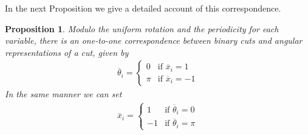 \documentclass[12pt,a4paper]{article}
\theoremstyle{mythm}
\newtheorem{prop}[thm]{Proposition}
\begin{document}
In the next Proposition we give a detailed account of this correspondence.
\begin{prop}
Modulo the uniform rotation and the periodicity for each variable, there is an one-to-one correspondence between binary cuts and angular representations
of a cut, given by
\begin{align}
\label{eq:ass1to1} 
\overline{ \theta } _{ i } = \begin{cases}
0 & \text{if } \overline{ x } _{ i } = 1 \\
\pi & \text{if } \overline{ x } _{ i } = -1
\end{cases}
\end{align} 
In the same manner we can set
\begin{align*}
\overline{ x } _{ i } = \begin{cases}
1 & \text{if } \overline{ \theta } _{ i } = 0 \\
-1 & \text{if } \overline{ \theta } _{ i  } = \pi
\end{cases}
\end{align*} 
\end{prop} 
\end{document}
